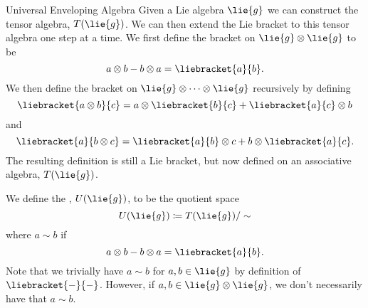 \begin{dfn}{Universal Enveloping Algebra}{}
    Given a Lie algebra \(\lie{g}\) we can construct the tensor algebra, \(T(\lie{g})\).
    We can then extend the Lie bracket to this tensor algebra one step at a time.
    We first define the bracket on \(\lie{g}\otimes\lie{g}\) to be
    \begin{equation}
        a\otimes b - b\otimes a = \liebracket{a}{b}.
    \end{equation}
    We then define the bracket on \(\lie{g} \otimes \dotsb \otimes \lie{g}\) recursively by defining
    \begin{equation}
        \liebracket{a\otimes b}{c} = a\otimes\liebracket{b}{c} + \liebracket{a}{c}\otimes b
    \end{equation}
    and
    \begin{equation}
        \liebracket{a}{b\otimes c} = \liebracket{a}{b}\otimes c + b\otimes \liebracket{a}{c}.
    \end{equation}
    The resulting definition is still a Lie bracket, but now defined on an associative algebra, \(T(\lie{g})\).
    
    We define the , \(U(\lie{g})\), to be the quotient space
    \begin{equation}
        U(\lie{g}) \coloneqq T(\lie{g}) / \sim
    \end{equation}
    where \(a \sim b\) if
    \begin{equation}
        a\otimes b - b\otimes a = \liebracket{a}{b}.
    \end{equation}
    Note that we trivially have \(a \sim b\) for \(a, b \in \lie{g}\) by definition of \(\liebracket{-}{-}\).
    However, if \(a, b \in \lie{g} \directproduct \lie{g}\), we don't necessarily have that \(a \sim b\).
\end{dfn}